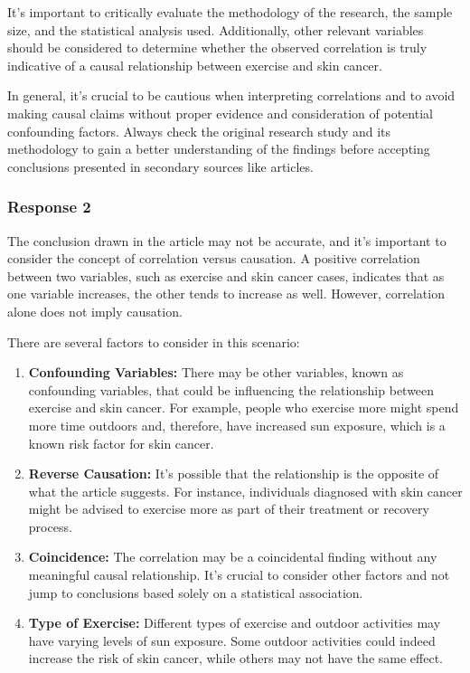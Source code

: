 \documentclass[12pt, a4paper]{article}
\begin{document}
It's important to critically evaluate the methodology of the research, the sample size, and the statistical analysis used. Additionally, other relevant variables should be considered to determine whether the observed correlation is truly indicative of a causal relationship between exercise and skin cancer.

In general, it's crucial to be cautious when interpreting correlations and to avoid making causal claims without proper evidence and consideration of potential confounding factors. Always check the original research study and its methodology to gain a better understanding of the findings before accepting conclusions presented in secondary sources like articles.

\subsubsection*{Response 2}
The conclusion drawn in the article may not be accurate, and it's important to consider the concept of correlation versus causation. A positive correlation between two variables, such as exercise and skin cancer cases, indicates that as one variable increases, the other tends to increase as well. However, correlation alone does not imply causation.

There are several factors to consider in this scenario:

\begin{enumerate}
    \item \textbf{Confounding Variables:} There may be other variables, known as confounding variables, that could be influencing the relationship between exercise and skin cancer. For example, people who exercise more might spend more time outdoors and, therefore, have increased sun exposure, which is a known risk factor for skin cancer.

    \item \textbf{Reverse Causation:} It's possible that the relationship is the opposite of what the article suggests. For instance, individuals diagnosed with skin cancer might be advised to exercise more as part of their treatment or recovery process.

    \item \textbf{Coincidence:} The correlation may be a coincidental finding without any meaningful causal relationship. It's crucial to consider other factors and not jump to conclusions based solely on a statistical association.

    \item \textbf{Type of Exercise:} Different types of exercise and outdoor activities may have varying levels of sun exposure. Some outdoor activities could indeed increase the risk of skin cancer, while others may not have the same effect.
\end{enumerate}
\end{document}
